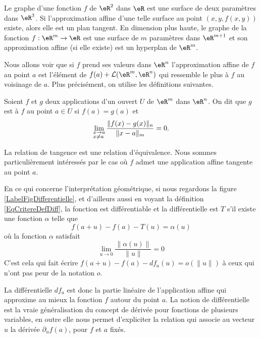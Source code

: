 Le graphe d'une fonction $f$ de $\eR^2$ dans $\eR$ est une surface de deux paramètres dans $\eR^3$. Si l'approximation affine d'une telle surface au point $(x,y,f(x,y))$ existe, alors elle est un plan tangent. En dimension plus haute, le graphe de la fonction $f:\eR^m\to\eR$ est une surface de $m$ paramètres dans $\eR^{m+1}$ et son approximation affine (si elle existe) est un hyperplan de $\eR^m$. 

Nous allons voir que si $f$ prend ses valeurs dans $\eR^n$ l'approximation affine de $f$ au point $a$ est l'élément de $ f(a)+\mathcal{L}(\eR^m,\eR^n)$ qui ressemble le plus à $f$ au voisinage de $a$. Plus précisément, on utilise les définitions suivantes.         
\begin{definition}
  Soient $f$ et $g$ deux applications d'un ouvert $U$ de $\eR^m$ dans $\eR^n$. On dit que $g$ est  à $f$ au point $a\in U$ si $f(a)=g(a)$ et 
\[
\lim_{\begin{subarray}{l}
    x\to a\\ x\neq a
  \end{subarray}}\frac{\|f(x)-g(x)\|_n}{\|x-a\|_m}=0.
\]
\end{definition}
La relation de tangence est une relation d'équivalence. Nous sommes particulièrement intéressés par le cas où $f$ admet une application  affine tangente au point $a$. 


\newcommand{\CaptionFigDifferentielle}{Interprétation géométrique de la différentielle.}

En ce qui concerne l'interprétation géométrique, si nous regardons la figure \ref{LabelFigDifferentielle}, et d'ailleurs aussi en voyant la définition \ref{EqCritereDefDiff}, la fonction est différentiable et la différentielle est \( T\) s'il existe une fonction \( \alpha\) telle que
\begin{equation}
    f(a+u)-f(a)-T(u)=\alpha(u)
\end{equation}
où la fonction \( \alpha\) satisfait
\begin{equation}		\label{EqPresqueTa}
	\lim_{u\to 0} \frac{ \| \alpha(u)\| }{\| u \|}=0
\end{equation}
C'est cela qui fait écrire \( f(a+u)-f(a)-df_a(u)=o(\| u \|)\) à ceux qui n'ont pas peur de la notation \( o\).

La différentielle $df_a$ est donc la partie linéaire de l'application affine qui approxime au mieux la fonction $f$ autour du point $a$. La notion de différentielle est la vraie généralisation du concept de dérivée pour fonctions de plusieurs variables, en outre elle nous permet d'expliciter la relation qui associe au vecteur $u$ la dérivée $\partial_u f(a)$, pour $f$ et $a$ fixés.  

